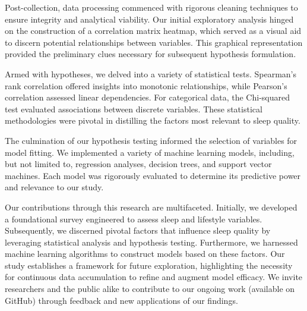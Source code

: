 \documentclass[conference]{IEEEtran}
\begin{document}
Post-collection, data processing commenced with rigorous cleaning techniques to ensure integrity and analytical viability. Our initial exploratory analysis hinged on the construction of a correlation matrix heatmap, which served as a visual aid to discern potential relationships between variables. This graphical representation provided the preliminary clues necessary for subsequent hypothesis formulation.

Armed with hypotheses, we delved into a variety of statistical tests. Spearman's rank correlation offered insights into monotonic relationships, while Pearson's correlation assessed linear dependencies. For categorical data, the Chi-squared test\cite{chi} evaluated associations between discrete variables. These statistical methodologies were pivotal in distilling the factors most relevant to sleep quality.

The culmination of our hypothesis testing informed the selection of variables for model fitting. We implemented a variety of machine learning models, including, but not limited to, regression analyses, decision trees, and support vector machines. Each model was rigorously evaluated to determine its predictive power and relevance to our study.

Our contributions through this research are multifaceted. Initially, we developed a foundational survey engineered to assess sleep and lifestyle variables. Subsequently, we discerned pivotal factors that influence sleep quality by leveraging statistical analysis and hypothesis testing. Furthermore, we harnessed machine learning algorithms to construct models based on these factors. Our study establishes a framework for future exploration, highlighting the necessity for continuous data accumulation to refine and augment model efficacy. We invite researchers and the public alike to contribute to our ongoing work (available on GitHub\footnotemark) through feedback and new applications of our findings.
\end{document}
